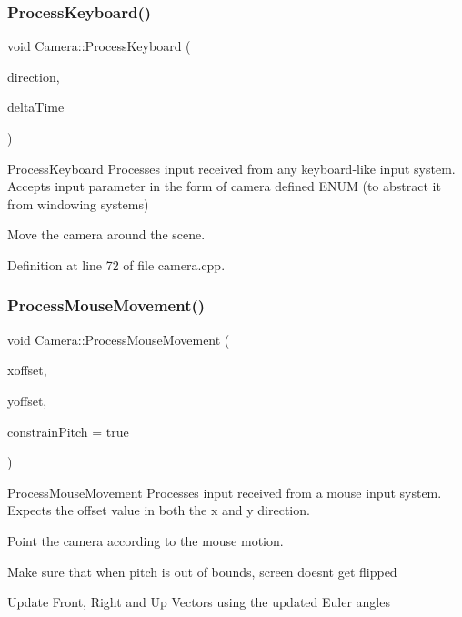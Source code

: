 \subsubsection{\texorpdfstring{Process\+Keyboard()}{ProcessKeyboard()}}
{\footnotesize\ttfamily void Camera\+::\+Process\+Keyboard (\begin{DoxyParamCaption}\item[{\hyperlink{classCamera_a910e91793a0078a11eef1cba77dec353}{Camera\+\_\+\+Movement}}]{direction,  }\item[{float}]{delta\+Time }\end{DoxyParamCaption})}



Process\+Keyboard Processes input received from any keyboard-\/like input system. Accepts input parameter in the form of camera defined E\+N\+UM (to abstract it from windowing systems) 

Move the camera around the scene. 

Definition at line 72 of file camera.\+cpp.

\mbox{\label{classCamera_a656c2a8dc40150874f15bce47b789751}} 
\subsubsection{\texorpdfstring{Process\+Mouse\+Movement()}{ProcessMouseMovement()}}
{\footnotesize\ttfamily void Camera\+::\+Process\+Mouse\+Movement (\begin{DoxyParamCaption}\item[{float}]{xoffset,  }\item[{float}]{yoffset,  }\item[{G\+Lboolean}]{constrain\+Pitch = {\ttfamily true} }\end{DoxyParamCaption})}



Process\+Mouse\+Movement Processes input received from a mouse input system. Expects the offset value in both the x and y direction. 

Point the camera according to the mouse motion.

Make sure that when pitch is out of bounds, screen doesn\textquotesingle{}t get flipped

Update Front, Right and Up Vectors using the updated Euler angles 

